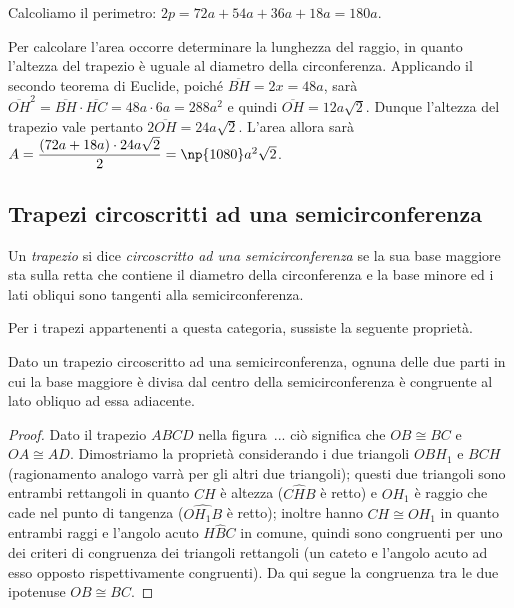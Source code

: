 \begin{exrig}
\begin{esempio}
Calcoliamo il perimetro: $2p=72a+54a+36a+18a=180a$.

Per calcolare l'area occorre determinare la lunghezza del raggio, in quanto l'altezza del trapezio è uguale al diametro della circonferenza. Applicando il secondo teorema di Euclide, poiché $\overline{BH}=2x=48a$, sarà $\overline{OH}^2=\overline{BH}\cdot\overline{HC}=48a\cdot 6a=288a^2$ e quindi $\overline{OH}=12a\sqrt{2}$. Dunque l'altezza del trapezio vale pertanto $2\overline{OH}=24a\sqrt{2}$. L'area allora sarà $A=\dfrac{(72a+18a)\cdot 24a\sqrt{2}}{2}=\np{1080}a^2\sqrt{2}$.
\end{esempio}
\end{exrig}

\subsection{Trapezi circoscritti ad una semicirconferenza}

\begin{definizione}
Un \emph{trapezio} si dice \emph{circoscritto ad una semicirconferenza} se la sua base maggiore sta sulla retta che contiene il diametro della circonferenza e la base minore ed i lati obliqui sono tangenti alla semicirconferenza.
\end{definizione}

Per i trapezi appartenenti a questa categoria, sussiste la seguente proprietà.

\begin{proprieta}
Dato un trapezio circoscritto ad una semicirconferenza, ognuna delle due parti in cui la base maggiore è divisa dal centro della semicirconferenza è congruente al lato obliquo ad essa adiacente.
\end{proprieta}

\begin{proof}
Dato il trapezio $ABCD$ nella figura~... ciò significa che $OB\cong BC$ e $OA\cong AD$. Dimostriamo la proprietà considerando i due triangoli $OBH_1$ e $BCH$ (ragionamento analogo varrà per gli altri due triangoli); questi due triangoli sono entrambi rettangoli in quanto $CH$ è altezza ($C\widehat{H}B$ è retto) e $OH_1$ è raggio che cade nel punto di tangenza ($O\widehat{H_1}B$ è retto); inoltre hanno $CH\cong OH_1$ in quanto entrambi raggi e l'angolo acuto $H\widehat{B}C$ in comune, quindi sono congruenti per uno dei criteri di congruenza dei triangoli rettangoli (un cateto e l'angolo acuto ad esso opposto rispettivamente congruenti). Da qui segue la congruenza tra le due ipotenuse $OB\cong BC$.
\end{proof}

